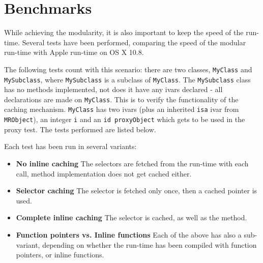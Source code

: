 \chapter{Benchmarks}

While achieving the modularity, it is also important to keep the speed of the run-time. Several tests have been performed, comparing the speed of the modular run-time with Apple run-time on OS X 10.8.

The following tests count with this scenario: there are two classes, \verb=MyClass= and \verb=MySubclass=, where \verb=MySubclass= is a subclass of \verb=MyClass=. The \verb=MySubclass= class has no methods implemented, not does it have any ivars declared - all declarations are made on \verb=MyClass=. This is to verify the functionality of the caching mechanism. \verb=MyClass= has two ivars (plus an inherited \verb=isa= ivar from \verb=MRObject=), an integer \verb=i= and an \verb=id proxyObject= which gets to be used in the proxy test. The tests performed are listed below.

Each test has been run in several variants:

\begin{itemize}
	\item{\bf{No inline caching}} The selectors are fetched from the run-time with each call, method implementation does not get cached either.
	\item{\bf{Selector caching}} The selector is fetched only once, then a cached pointer is used.
	\item{\bf{Complete inline caching}} The selector is cached, as well as the method.
	\item{\bf{Function pointers vs. Inline functions}} Each of the above has also a sub-variant, depending on whether the run-time has been compiled with function pointers, or inline functions.
\end{itemize}

